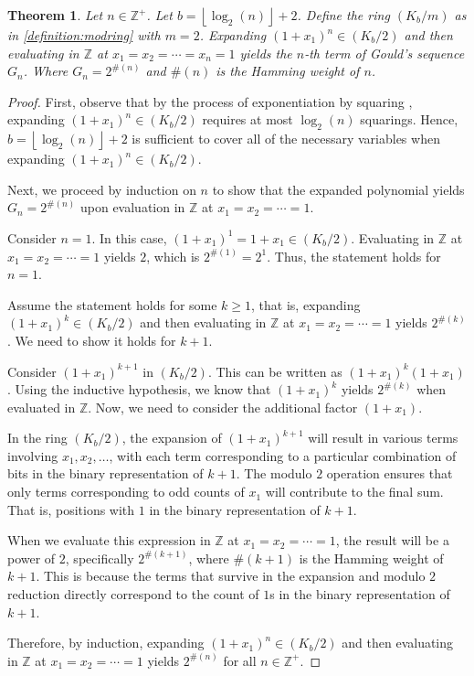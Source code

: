\documentclass{article}
\theoremstyle{plain}
\theoremstyle{definition}
\newtheorem{theorem}{Theorem}
\newcommand{\floor}[1]{\left\lfloor #1 \right\rfloor}
\newcommand{\Z}{\mathbb{Z}}
\newcommand{\K}{K}
\newcommand{\wt}[1]{\#(#1)}
\begin{document}
\begin{theorem}
\label{theorem:goulds}
\textit{
Let $n \in \Z^+$. Let $b={\floor{\log_2(n)}+2}$. Define the ring $(\K_b/m)$ as in \cref{definition:modring} with $m=2$. Expanding $(1+x_1)^n \in (\K_b/2)$ and then evaluating in $\Z$ at $x_1=x_2=\cdots=x_n=1$ yields the $n$-th term of Gould's sequence $G_n$. Where $G_n = 2^{\wt{n}}$ and $\wt{n}$ is the Hamming weight of $n$.
}
\end{theorem}
\begin{proof}
First, observe that by the process of exponentiation by squaring \cite{knuth1997art}, expanding $(1+x_1)^n \in (\K_b/2)$ requires at most $\log_2(n)$ squarings. Hence, $b={\floor{\log_2(n)}+2}$ is sufficient to cover all of the necessary variables when expanding $(1+x_1)^n \in (\K_b/2)$.

Next, we proceed by induction on $n$ to show that the expanded polynomial yields $G_n = 2^{\wt{n}}$ upon evaluation in $\Z$ at $x_1=x_2=\cdots=1$.

Consider $n = 1$. In this case, $(1 + x_1)^1 = 1 + x_1 \in (\K_b/2)$. Evaluating in $\Z$ at $x_1=x_2=\cdots=1$ yields $2$, which is $2^{\wt{1}} = 2^1$. Thus, the statement holds for $n = 1$.

Assume the statement holds for some $k \geq 1$, that is, expanding $(1 + x_1)^k \in (\K_b/2)$ and then evaluating in $\Z$ at $x_1=x_2=\cdots=1$ yields $2^{\wt{k}}$. We need to show it holds for $k+1$.

Consider $(1 + x_1)^{k+1}$ in $(\K_b/2)$. This can be written as $(1 + x_1)^k (1 + x_1)$. Using the inductive hypothesis, we know that $(1 + x_1)^k$ yields $2^{\wt{k}}$ when evaluated in $\Z$. Now, we need to consider the additional factor $(1 + x_1)$.

In the ring $(\K_b/2)$, the expansion of $(1 + x_1)^{k+1}$ will result in various terms involving $x_1, x_2, \ldots$, with each term corresponding to a particular combination of bits in the binary representation of $k+1$. The modulo $2$ operation ensures that only terms corresponding to odd counts of $x_1$ will contribute to the final sum. That is, positions with $1$ in the binary representation of $k+1$.

When we evaluate this expression in $\Z$ at $x_1=x_2=\cdots=1$, the result will be a power of $2$, specifically $2^{\wt{k+1}}$, where $\wt{k+1}$ is the Hamming weight of $k+1$. This is because the terms that survive in the expansion and modulo $2$ reduction directly correspond to the count of $1$s in the binary representation of $k+1$.

Therefore, by induction, expanding $(1 + x_1)^n \in (\K_b/2)$ and then evaluating in $\Z$ at $x_1=x_2=\cdots=1$ yields $2^{\wt{n}}$ for all $n \in \Z^+$.
\end{proof}
\end{document}
